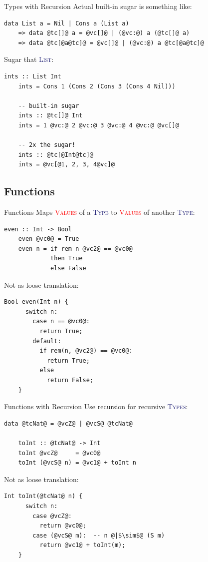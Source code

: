 \documentclass[xcolor={usenames,dvipsnames}]{beamer}
\newcommand{\htycon}[1]{\textcolor{MidnightBlue}{\textsc{#1}}}
\newcommand{\hvalcon}[1]{\textcolor{Red}{\textsc{#1}}}
\begin{document}
\begin{frame}[fragile]{Types with Recursion}
  Actual built-in sugar is something like:
  \begin{lstlisting}[style=hask]
       data List a = Nil | Cons a (List a)
    => data @tc[]@ a = @vc[]@ | (@vc:@) a (@tc[]@ a)
    => data @tc[@a@tc]@ = @vc[]@ | (@vc:@) a @tc[@a@tc]@
  \end{lstlisting}

  Sugar that \htycon{List}:
  \begin{lstlisting}[style=hask]
    ints :: List Int 
    ints = Cons 1 (Cons 2 (Cons 3 (Cons 4 Nil)))

    -- built-in sugar
    ints :: @tc[]@ Int
    ints = 1 @vc:@ 2 @vc:@ 3 @vc:@ 4 @vc:@ @vc[]@

    -- 2x the sugar!
    ints :: @tc[@Int@tc]@
    ints = @vc[@1, 2, 3, 4@vc]@
  \end{lstlisting}
\end{frame}


\subsection{Functions}

\begin{frame}[fragile]{Functions}
  Maps \hvalcon{Values} of a \htycon{Type} to \hvalcon{Values} of another \htycon{Type}:
  \begin{lstlisting}[style=hask]
    even :: Int -> Bool
    even @vc0@ = True
    even n = if rem n @vc2@ == @vc0@
             then True
             else False
  \end{lstlisting}

  Not as loose translation:
  \begin{lstlisting}[style=hask]
    Bool even(Int n) {
      switch n:
        case n == @vc0@:
          return True;
        default:
          if rem(n, @vc2@) == @vc0@:
            return True;
          else
            return False;
    }
  \end{lstlisting}
\end{frame}

\begin{frame}[fragile]{Functions with Recursion}
  Use recursion for recursive \htycon{Types}:
  \begin{lstlisting}[style=hask]
    data @tcNat@ = @vcZ@ | @vcS@ @tcNat@

    toInt :: @tcNat@ -> Int
    toInt @vcZ@     = @vc0@
    toInt (@vcS@ n) = @vc1@ + toInt n
  \end{lstlisting}

  Not as loose translation:
  \begin{lstlisting}[style=hask]
    Int toInt(@tcNat@ n) {
      switch n:
        case @vcZ@:
          return @vc0@;
        case (@vcS@ m):  -- n @|$\sim$@ (S m)
          return @vc1@ + toInt(m);
    }
  \end{lstlisting}
\end{frame}
\end{document}
